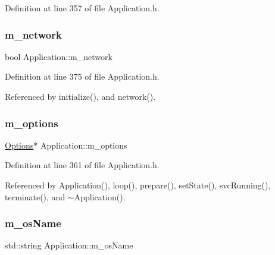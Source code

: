 Definition at line 357 of file Application.\+h.

\mbox{\label{classApplication_a7dc2bb72356cd9186eaad49eb506995a}} 
\subsubsection{\texorpdfstring{m\+\_\+network}{m\_network}}
{\footnotesize\ttfamily bool Application\+::m\+\_\+network\hspace{0.3cm}{\ttfamily [private]}}



Definition at line 375 of file Application.\+h.



Referenced by initialize(), and network().

\mbox{\label{classApplication_a3b0c74bf1ba99a5042990e3fefaa8963}} 
\subsubsection{\texorpdfstring{m\+\_\+options}{m\_options}}
{\footnotesize\ttfamily \hyperlink{classOptions}{Options}$\ast$ Application\+::m\+\_\+options\hspace{0.3cm}{\ttfamily [private]}}



Definition at line 361 of file Application.\+h.



Referenced by Application(), loop(), prepare(), set\+State(), svc\+Running(), terminate(), and $\sim$\+Application().

\mbox{\label{classApplication_a59f90c6ff4ee3db646ca656c71cc77e7}} 
\subsubsection{\texorpdfstring{m\+\_\+os\+Name}{m\_osName}}
{\footnotesize\ttfamily std\+::string Application\+::m\+\_\+os\+Name\hspace{0.3cm}{\ttfamily [protected]}}



